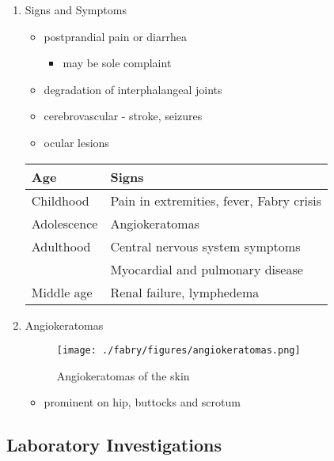 \documentclass{scrartcl}
\begin{document}
\begin{enumerate}
\item Signs and Symptoms
\label{sec:org4c2890b}

\begin{itemize}
\item postprandial pain or diarrhea
\begin{itemize}
\item may be sole complaint
\end{itemize}
\item degradation of interphalangeal joints
\item cerebrovascular - stroke, seizures
\item ocular lesions
\end{itemize}


\begin{center}
\begin{tabular}{ll}
Age & Signs\\
\hline
Childhood & Pain in extremities, fever, Fabry crisis \footnotemark\\
Adolescence & Angiokeratomas\\
Adulthood & Central nervous system symptoms\\
 & Myocardial and pulmonary disease\\
Middle age & Renal failure, lymphedema\\
\end{tabular}
\end{center}


\item Angiokeratomas
\label{sec:org210e2f6}


\begin{figure}[htbp]
\centering
\texttt{[image: ./fabry/figures/angiokeratomas.png]}
\caption[Angiokeratomas of the skin]{\label{fig:orgffbedf3}
Angiokeratomas of the skin}
\end{figure}

\begin{itemize}
\item prominent on hip, buttocks and scrotum
\end{itemize}
\end{enumerate}

\subsection{Laboratory Investigations}
\label{sec:org461b29a}
\end{document}
